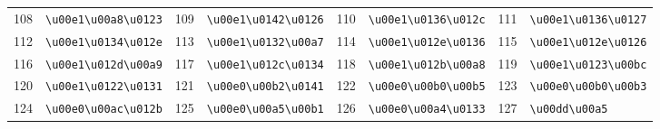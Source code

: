 \begin{table}[!htbp]
\begin{tabular}{r l r l r l r l}
108 & \texttt{\textbackslash{}u00e1\textbackslash{}u00a8\textbackslash{}u0123} & 109 & \texttt{\textbackslash{}u00e1\textbackslash{}u0142\textbackslash{}u0126} & 110 & \texttt{\textbackslash{}u00e1\textbackslash{}u0136\textbackslash{}u012c} & 111 & \texttt{\textbackslash{}u00e1\textbackslash{}u0136\textbackslash{}u0127} \\
112 & \texttt{\textbackslash{}u00e1\textbackslash{}u0134\textbackslash{}u012e} & 113 & \texttt{\textbackslash{}u00e1\textbackslash{}u0132\textbackslash{}u00a7} & 114 & \texttt{\textbackslash{}u00e1\textbackslash{}u012e\textbackslash{}u0136} & 115 & \texttt{\textbackslash{}u00e1\textbackslash{}u012e\textbackslash{}u0126} \\
116 & \texttt{\textbackslash{}u00e1\textbackslash{}u012d\textbackslash{}u00a9} & 117 & \texttt{\textbackslash{}u00e1\textbackslash{}u012c\textbackslash{}u0134} & 118 & \texttt{\textbackslash{}u00e1\textbackslash{}u012b\textbackslash{}u00a8} & 119 & \texttt{\textbackslash{}u00e1\textbackslash{}u0123\textbackslash{}u00bc} \\
120 & \texttt{\textbackslash{}u00e1\textbackslash{}u0122\textbackslash{}u0131} & 121 & \texttt{\textbackslash{}u00e0\textbackslash{}u00b2\textbackslash{}u0141} & 122 & \texttt{\textbackslash{}u00e0\textbackslash{}u00b0\textbackslash{}u00b5} & 123 & \texttt{\textbackslash{}u00e0\textbackslash{}u00b0\textbackslash{}u00b3} \\
124 & \texttt{\textbackslash{}u00e0\textbackslash{}u00ac\textbackslash{}u012b} & 125 & \texttt{\textbackslash{}u00e0\textbackslash{}u00a5\textbackslash{}u00b1} & 126 & \texttt{\textbackslash{}u00e0\textbackslash{}u00a4\textbackslash{}u0133} & 127 & \texttt{\textbackslash{}u00dd\textbackslash{}u00a5} \\

\end{tabular}
\end{table}
